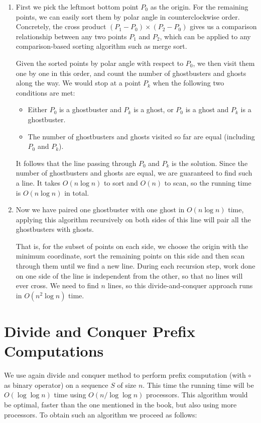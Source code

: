 \documentclass[11pt]{article}
\begin{document}
    \begin{enumerate}[leftmargin=*, topsep=0pt]
      \item First we pick the leftmost bottom point $P_0$ as the origin. For the remaining points, we can easily sort them by polar angle in counterclockwise order. Concretely, the cross product $(P_1 - P_0) \times (P_2 - P_0)$ gives us a comparison relationship between any two points $P_1$ and $P_2$, which can be applied to any comparison-based sorting algorithm such as merge sort.

      Given the sorted points by polar angle with respect to $P_0$, we then visit them one by one in this order, and count the number of ghostbusters and ghosts along the way. We would stop at a point $P_k$ when the following two conditions are met:

      \begin{itemize}[leftmargin=*, topsep=0pt]
          \item Either $P_0$ is a ghostbuster and $P_k$ is a ghost, or $P_0$ is a ghost and $P_k$ is a ghostbuster.
          \item The number of ghostbusters and ghosts visited so far are equal (including $P_0$ and $P_k$).
      \end{itemize}

      It follows that the line passing through $P_0$ and $P_k$ is the solution. Since the number of ghostbusters and ghosts are equal, we are guaranteed to find such a line. It takes $O(n\log n)$ to sort and $O(n)$ to scan, so the running time is $O(n\log n)$ in total.

      \item Now we have paired one ghostbuster with one ghost in $O(n\log n)$ time, applying this algorithm recursively on both sides of this line will pair all the ghostbusters with ghosts.

      That is, for the subset of points on each side, we choose the origin with the minimum coordinate, sort the remaining points on this side and then scan through them until we find a new line. During each recursion step, work done on one side of the line is independent from the other, so that no lines will ever cross. We need to find $n$ lines, so this divide-and-conquer approach runs in $O(n^2\log n)$ time.
    \end{enumerate}

  \section{Divide and Conquer Prefix Computations}
    We use again divide and conquer method to perform prefix computation (with $\circ$ as binary operator) on a sequence $S$ of size $n$. This time the running time will be $O(\log \log n)$ time using $O(n/\log \log n)$ processors. This algorithm would be optimal, faster than the one mentioned in the book, but also using more processors. To obtain such an algorithm we proceed as follows:
\end{document}
